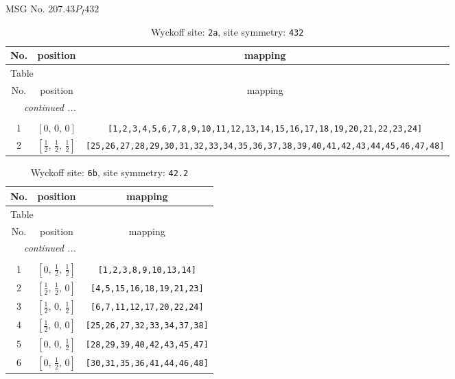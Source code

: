 \documentclass[fleqn,8pt]{jsarticle}
\begin{document}
\setcounter{MaxMatrixCols}{32}

\renewcommand{\tablename}{Table~}
\renewcommand{\figurename}{Figure~}
\begin{center}
\LARGE
MSG No. 207.43\quad$P_{I}432$
\end{center}
\renewcommand{\arraystretch}{1.2}
\begin{longtable}{ccc}
\caption{Wyckoff site: {\tt 2a}, site symmetry: {\tt 432}}
 \\
 \hline \hline
No. & position & mapping \\ \hline \endfirsthead

\multicolumn{2}{l}{\tablename\ \thetable{}} \\
 \hline \hline
No. & position & mapping \\ \hline \endhead

 \hline \hline
\multicolumn{2}{r}{\footnotesize\it continued ...} \\ \endfoot

 \hline \hline
\multicolumn{2}{r}{} \\ \endlastfoot

1 & $\left[ 0,\, 0,\, 0 \right]$ & {\tt [1,2,3,4,5,6,7,8,9,10,11,12,13,14,15,16,17,18,19,20,21,22,23,24]} \\ \hline
2 & $\left[ \frac{1}{2},\, \frac{1}{2},\, \frac{1}{2} \right]$ & {\tt [25,26,27,28,29,30,31,32,33,34,35,36,37,38,39,40,41,42,43,44,45,46,47,48]} \\
\end{longtable}
\renewcommand{\arraystretch}{1.2}
\begin{longtable}{ccc}
\caption{Wyckoff site: {\tt 6b}, site symmetry: {\tt 42.2}}
 \\
 \hline \hline
No. & position & mapping \\ \hline \endfirsthead

\multicolumn{2}{l}{\tablename\ \thetable{}} \\
 \hline \hline
No. & position & mapping \\ \hline \endhead

 \hline \hline
\multicolumn{2}{r}{\footnotesize\it continued ...} \\ \endfoot

 \hline \hline
\multicolumn{2}{r}{} \\ \endlastfoot

1 & $\left[ 0,\, \frac{1}{2},\, \frac{1}{2} \right]$ & {\tt [1,2,3,8,9,10,13,14]} \\ \hline
2 & $\left[ \frac{1}{2},\, \frac{1}{2},\, 0 \right]$ & {\tt [4,5,15,16,18,19,21,23]} \\ \hline
3 & $\left[ \frac{1}{2},\, 0,\, \frac{1}{2} \right]$ & {\tt [6,7,11,12,17,20,22,24]} \\ \hline
4 & $\left[ \frac{1}{2},\, 0,\, 0 \right]$ & {\tt [25,26,27,32,33,34,37,38]} \\ \hline
5 & $\left[ 0,\, 0,\, \frac{1}{2} \right]$ & {\tt [28,29,39,40,42,43,45,47]} \\ \hline
6 & $\left[ 0,\, \frac{1}{2},\, 0 \right]$ & {\tt [30,31,35,36,41,44,46,48]} \\
\end{longtable}
\end{document}
